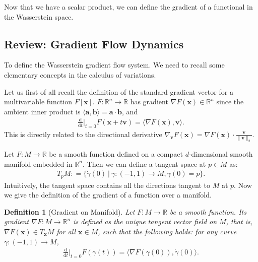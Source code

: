 \documentclass[11pt]{book}
\newtheorem{definition}[theorem]{Definition}
\newcommand{\bx}{\mathbf x}
\newcommand{\bv}{\mathbf v}
\begin{document}
Now that we have a scalar product, we can define the gradient of a functional in the Wasserstein space.





\subsection{Review: Gradient Flow Dynamics}

To define the Wasserstein gradient flow system. We need to recall some elementary concepts in the calculus of variations. 

Let us first of all recall the definition of the standard gradient vector for a multivariable function $F[\bx]$. $F:\mathbb{R}^n\rightarrow \mathbb{R}$ has gradient $\nabla F(\bx)\in\mathbb{R}^n$ since the ambient inner product is $\langle \mathbf{a}, \mathbf{b} \rangle = \mathbf{a} \cdot \mathbf{b} $, and 
\begin{align}
    \frac{\mathrm{d}}{\mathrm{d}t} \Big|_{t=0} F(\bx + t \bv) = \langle \nabla F(\bx), \bv \rangle.
\end{align}
This is directly related to the directional derivative $\nabla_{\bv} F(\bx) = \nabla F(\bx)\cdot \frac{\bv}{\|\bv\|_2}$.


Let $F: M\rightarrow \mathbb{R}$ be a smooth function defined on a compact $d$-dimensional smooth manifold embedded in $\mathbb{R}^n$. Then we can define a tangent space at $p\in M$ as: 
\begin{align}
    T_pM: = \Big\{ \dot{\gamma}(0) \ \big|\ \gamma: (-1,1) \rightarrow M, \gamma(0) = p \Big\}.
\end{align}
Intuitively, the tangent space contains all the directions tangent to $M$ at $p$. Now we give the definition of the gradient of a function over a manifold. 

\begin{definition}[Gradient on Manifold]
    Let $F: M\rightarrow \mathbb{R}$ be a smooth function. Its gradient $\nabla F: M \rightarrow \mathbb{R}^n$ is defined as the unique tangent vector field on $M$, that is, $\nabla F(\bx) \in T_{\bx}M$ for all $\bx \in M$, such that the following holds: for any curve $\gamma: (-1,1) \rightarrow M$,
    \begin{align}
        \frac{\mathrm{d}}{\mathrm{d}t} \Big|_{t=0} F(\gamma(t)) = \langle \nabla F(\gamma(0)), \dot{\gamma}(0) \rangle.
    \end{align}
\end{definition}
\end{document}
